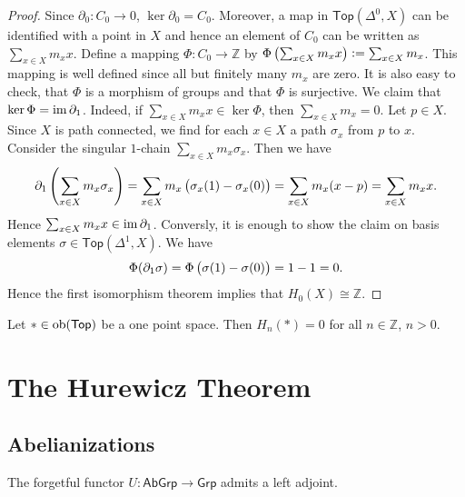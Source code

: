 \begin{proof}
	Since $\partial_0 : C_0 \to 0$, $\ker \partial_0 = C_0$. Moreover, a map in $\mathsf{Top}(\Delta^0,X)$ can be identified with a point in $X$ and hence an element of $C_0$ can be written as $\sum_{x \in X}m_x x$. Define a mapping $\Phi : C_0 \to \mathbb{Z}$ by $\Phi\del[1]{\sum_{x \in X}m_x x} := \sum_{x \in X}m_x$. This mapping is well defined since all but finitely many $m_x$ are zero. It is also easy to check, that $\Phi$ is a morphism of groups and that $\Phi$ is surjective. We claim that $\ker \Phi = \operatorname{im} \partial_1$. Indeed, if $\sum_{x \in X} m_x x \in \ker \Phi$, then $\sum_{x \in X}m_x = 0$. Let $p \in X$. Since $X$ is path connected, we find for each $x \in X$ a path $\sigma_x$ from $p$ to $x$. Consider the singular $1$-chain $\sum_{x \in X}m_x \sigma_x$. Then we have
	\begin{equation*}
		\partial_1 \del[4]{\sum_{x \in X}m_x \sigma_x} = \sum_{x \in X}m_x \del[1]{\sigma_x(1)- \sigma_x(0)} = \sum_{x \in X}m_x (x - p) = \sum_{x \in X} m_x x.
	\end{equation*}
	Hence $\sum_{x \in X}m_x x \in \operatorname{im} \partial_1$. Conversly, it is enough to show the claim on basis elements $\sigma \in \mathsf{Top}(\Delta^1,X)$. We have
	\begin{equation*}
		\Phi(\partial_1 \sigma) = \Phi\del[1]{\sigma(1) - \sigma(0)} = 1 - 1 = 0.
	\end{equation*}
	Hence the first isomorphism theorem \cite[23]{grillet:abstract_algebra:2007} implies that $H_0(X) \cong \mathbb{Z}$.
\end{proof}

\begin{proposition}
	Let $\ast \in \operatorname{ob}(\mathsf{Top})$ be a one point space. Then $H_n(\ast) = 0$ for all $n \in \mathbb{Z}$, $n > 0$.
\end{proposition}

\section*{The Hurewicz Theorem}
\subsection*{Abelianizations}

\begin{proposition}
	The forgetful functor $U : \mathsf{AbGrp} \to \mathsf{Grp}$ admits a left adjoint.
	\label{prop:Ab_grp_abgrp}
\end{proposition}


